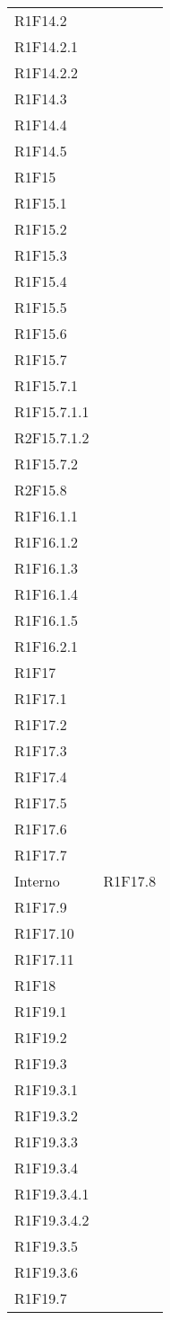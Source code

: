 \begin{center}
\begin{longtable}{ >{\centering}p{}
			>{\centering}p{}}
		R1F14.2\\
		R1F14.2.1\\
		R1F14.2.2\\
		R1F14.3\\
		R1F14.4\\
		R1F14.5\\
		R1F15\\
		R1F15.1\\
		R1F15.2\\
		R1F15.3\\
		R1F15.4\\
		R1F15.5\\
		R1F15.6\\
		R1F15.7\\
		R1F15.7.1\\
		R1F15.7.1.1\\
		R2F15.7.1.2\\
		R1F15.7.2\\
		R2F15.8\\
		R1F16.1.1\\
		R1F16.1.2\\
		R1F16.1.3\\
		R1F16.1.4\\
		R1F16.1.5\\
		R1F16.2.1\\
		R1F17\\
		R1F17.1\\
		R1F17.2\\
		R1F17.3\\
		R1F17.4\\
		R1F17.5\\
		R1F17.6\\
		R1F17.7 \tabularnewline
		Interno	&
		R1F17.8\\
		R1F17.9\\
		R1F17.10\\
		R1F17.11\\
		R1F18\\
		R1F19.1\\
		R1F19.2\\
		R1F19.3\\
		R1F19.3.1\\
		R1F19.3.2\\
		R1F19.3.3\\
		R1F19.3.4\\
		R1F19.3.4.1\\
		R1F19.3.4.2\\
		R1F19.3.5\\
		R1F19.3.6\\
		R1F19.7\\

\end{longtable}
\end{center}
